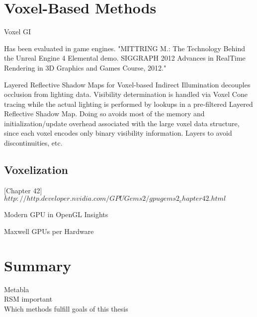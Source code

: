 \documentclass[thesis.tex]{subfiles}
\begin{document}
\section{Voxel-Based Methods}

Voxel GI

 Has been evaluated in game engines. "MITTRING M.: The Technology Behind the Unreal Engine 4 Elemental demo. SIGGRAPH 2012 Advances in RealTime Rendering in 3D Graphics and Games Course, 2012." 

Layered Reflective Shadow Maps for Voxel-based Indirect Illumination decouples occlusion from lighting data.
Visibility determination is handled via Voxel Cone tracing while the actual lighting is performed by lookups in a pre-filtered Layered Reflective Shadow Map.
Doing so avoids most of the memory and initialization/update overhead associated with the large voxel data structure, since each voxel encodes only binary visibility information.
Layers to avoid discontinuities, etc.

\subsection{Voxelization}

\cite{bib:GPUGems2}[Chapter 42] $http://http.developer.nvidia.com/GPUGems2/gpugems2_chapter42.html$

Modern GPU in OpenGL Insights \cite{bib:openglinsightsvoxel}

Maxwell GPUs per Hardware

\section{Summary}
Metabla\\
RSM important\\
Which methods fulfill goals of this thesis

\subfilebib %
\end{document}
